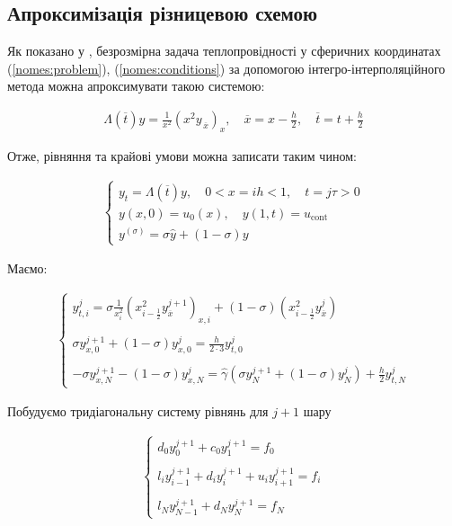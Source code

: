 \subsection{Апроксимізація різницевою схемою}

Як показано у \cite[с. 185-208]{Samarskii71}, безрозмірна задача теплопровідності у сферичних координатах (\ref{nomes:problem}), (\ref{nomes:conditions}) за допомогою інтегро-інтерполяційного метода можна апроксимувати такою системою:

\begin{equation}
\begin{multlined} \label{nomes:approx}
\Lambda(\overline{t}) y = \frac{1}{x^2}\left(x^2 y_{\,\overline{x}}\right)_x, \quad \overline{x} = x - \frac{h}{2}, \quad \overline{t} = t + \frac{h}{2}
\end{multlined}
\end{equation}

Отже, рівняння та крайові умови можна записати таким чином:

\begin{align}
\left\{\begin{array}{c}
y_t = \Lambda(\overline{t})y, \quad 0 < x = ih < 1, \quad t = j\tau > 0\\
y(x, 0) = u_0(x), \quad y(1, t) = u_\text{cont}\\
y^{(\sigma)} = \sigma\hat{y} + (1 - \sigma)y
\end{array}\right.
\end{align}

Маємо:

\begin{align} \label{diff:approx}
\left\{\begin{array}{c}
y_{t, i}^j = \sigma \frac{1}{x_i^2}\left( x_{i-\frac{1}{2}}^2 y_{\overline{x}}^{j+1}\right)_{x, i} + (1-\sigma)\left( x_{i-\frac{1}{2}}^2 y_{\overline{x}}^j\right) \\ \\
\sigma y_{x, 0}^{j+1} + (1-\sigma)y_{x, 0}^j = \frac{h}{2 \cdot 3} y_{t, 0}^j \\\\
-\sigma y_{x, N}^{j+1} - (1 -\sigma)y_{x, N}^j = \hat{\gamma} \left( \sigma y_{N}^{j+1} + (1-\sigma)y_N^j\right) + \frac{h}{2}y_{t, N}^j
\end{array}\right. 
\end{align}

Побудуємо тридіагональну систему рівнянь для \( j+1\) шару

\begin{align} \label{diff:approx}
\left\{\begin{array}{c}
d_0y_0^{j+1} + c_0y_1^{j+1} = f_0\\\\
l_iy_{i-1}^{j+1} + d_iy_i^{j+1} + u_iy_{i+1}^{j+1} = f_i\\\\
l_Ny_{N-1}^{j+1} + d_Ny_N^{j+1} = f_N
\end{array}\right. 
\end{align}

